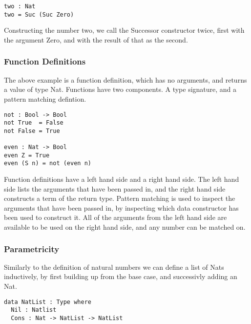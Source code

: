 \documentclass[a4paper]{article}
\begin{document}
\begin{center}
\begin{verbatim}
two : Nat
two = Suc (Suc Zero)
\end{verbatim}
\end{center}

Constructing the number two, we call the Successor constructor twice, first with the argument Zero,
and with the result of that as the second. 

\subsubsection{Function Definitions}
\label{sec:org406f0fb}
The above example is a function definition, which has no arguments, and returns a value of type Nat. 
Functions have two components. A type signature, and a pattern matching defintion.

\begin{center}
\begin{verbatim}
not : Bool -> Bool
not True  = False
not False = True

even : Nat -> Bool
even Z = True
even (S n) = not (even n) 
\end{verbatim}
\end{center}

Function definitions have a left hand side and a right hand side. The left hand side lists the arguments
that have been passed in, and the right hand side constructs a term of the return type. Pattern matching is
used to inspect the arguments that have been passed in, by inspecting which data constructor has been used to 
construct it. All of the arguments from the left hand side are available to be used on the right hand side, and
any number can be matched on.

\subsubsection{Parametricity}
\label{sec:orgeee961a}

Similarly to the definition of natural numbers we can define a list of Nats inductively, by first building up from 
the base case, and successivly adding an Nat.

\begin{center}
\begin{verbatim}
data NatList : Type where
  Nil : Natlist
  Cons : Nat -> NatList -> NatList 
\end{verbatim}
\end{center}
\end{document}
